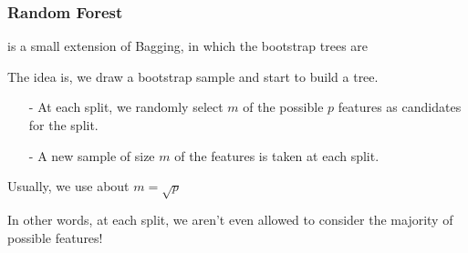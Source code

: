 \documentclass[12pt]{beamer}
\begin{document}
%
%
%



\begin{frame}[fragile]
\frametitle{Random Forest}
 is a small extension of Bagging, in which the bootstrap trees are   

\vsp
The idea is, we draw a bootstrap sample and start to build a tree. 
\begin{itemize}
\item[-] At each split, we randomly select
$m$ of the possible $p$ features as candidates for the split. 
\item[-] A new sample of size $m$ of the features is taken at each split. 
\end{itemize}   

\vsp
Usually, we use about $m = \sqrt{p}$ 


\vsp
In other words, at each split, we aren't even allowed to consider the majority of possible features!
\end{frame}
\end{document}
